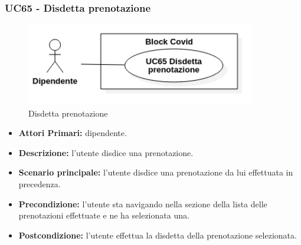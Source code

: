 \subsubsection{ UC65 - Disdetta prenotazione}
\begin{figure}[H]
		\centering
		\includegraphics[width=10cm]{res/images/UC65.png}
		\caption{Disdetta prenotazione}
		\label{fig:Disdetta prenotazione}
	\end{figure}
\begin{itemize}
	\item\textbf{Attori Primari:} dipendente.
	\item\textbf{Descrizione:} l’utente disdice una prenotazione. 
	\item\textbf{Scenario principale:} l’utente disdice una prenotazione da lui effettuata in precedenza.
	\item\textbf{Precondizione:} l'utente sta navigando nella sezione della lista delle prenotazioni effettuate e ne ha selezionata una.
	\item\textbf{Postcondizione:} l’utente effettua la disdetta della prenotazione selezionata.
\end{itemize}

